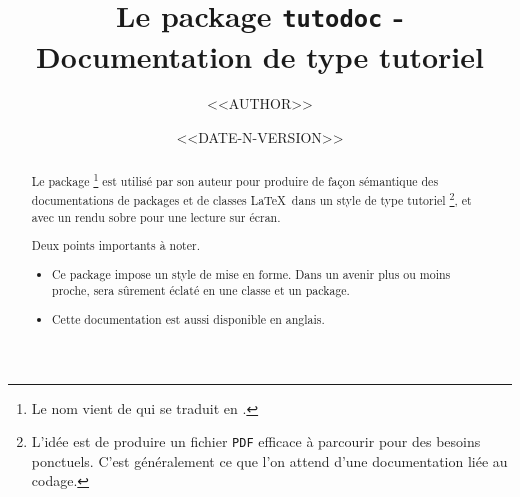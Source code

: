 \documentclass[12pt, a4paper]{article}
\begin{document}
\title{Le package \texttt{tutodoc} - Documentation de type tutoriel}
\author{<<AUTHOR>>}
\date{<<DATE-N-VERSION>>}

\maketitle

\begin{abstract}
    Le package 
    \footnote{
        Le nom vient de  qui se traduit en .
    }
    est utilisé par son auteur pour produire de façon sémantique des documentations de packages et de classes \LaTeX\ dans un style de type tutoriel
    \footnote{
        L'idée est de produire un fichier \texttt{PDF} efficace à parcourir pour des besoins ponctuels. C'est généralement ce que l'on attend d'une documentation liée au codage.
    },
    et avec un rendu sobre pour une lecture sur écran.
    
    \medskip
    
    \noindent
    Deux points importants à noter.
    \begin{itemize}
        \item Ce package impose un style de mise en forme. Dans un avenir plus ou moins proche,  sera sûrement éclaté en une classe et un package.
    
        \item Cette documentation est aussi disponible en anglais.
    \end{itemize}
\end{abstract}
\end{document}
